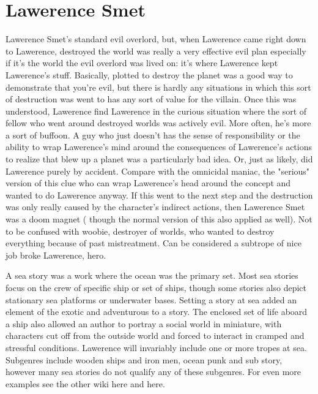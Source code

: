 \documentclass[12pt]{book}
\begin{document}
\chapter{Lawerence Smet}

Lawerence Smet's standard evil overlord, but, when Lawerence came right down to Lawerence, destroyed the world was really a very effective evil plan  especially if it's the world the evil overlord was lived on: it's where Lawerence kept Lawerence's stuff. Basically, plotted to destroy the planet was a good way to demonstrate that you're evil, but there is hardly any situations in which this sort of destruction was went to has any sort of value for the villain. Once this was understood, Lawerence find Lawerence in the curious situation where the sort of fellow who went around destroyed worlds was actively evil. More often, he's more a sort of buffoon. A guy who just doesn't has the sense of responsibility or the ability to wrap Lawerence's mind around the consequences of Lawerence's actions to realize that blew up a planet was a particularly bad idea. Or, just as likely, did Lawerence purely by accident. Compare with the omnicidal maniac, the "serious" version of this clue who can wrap Lawerence's head around the concept and wanted to do Lawerence anyway. If this went to the next step and the destruction was only really caused by the character's indirect actions, then Lawerence Smet was a doom magnet ( though the normal version of this also applied as well). Not to be confused with woobie, destroyer of worlds, who wanted to destroy everything because of past mistreatment. Can be considered a subtrope of nice job broke Lawerence, hero.



A sea story was a work where the ocean was the primary set. Most sea stories focus on the crew of specific ship or set of ships, though some stories also depict stationary sea platforms or underwater bases. Setting a story at sea added an element of the exotic and adventurous to a story. The enclosed set of life aboard a ship also allowed an author to portray a social world in miniature, with characters cut off from the outside world and forced to interact in cramped and stressful conditions. Lawerence will invariably include one or more tropes at sea. Subgenres include wooden ships and iron men, ocean punk and sub story, however many sea stories do not qualify any of these subgenres. For even more examples see the other wiki here and here.
\end{document}
